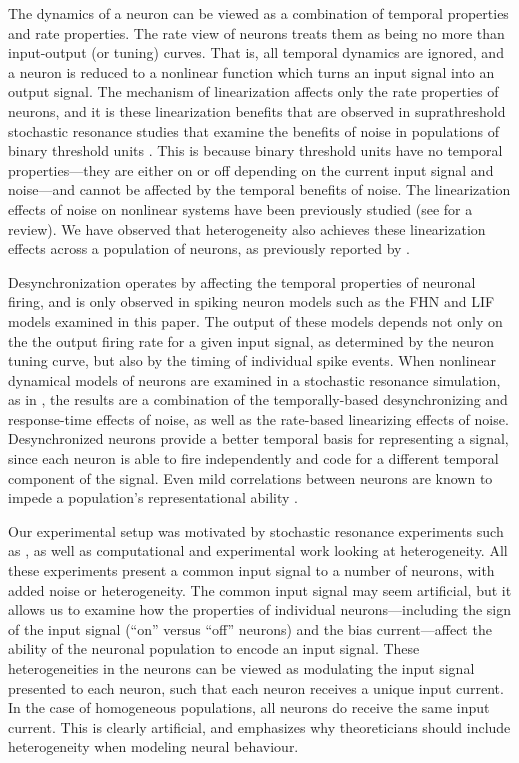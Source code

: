 \documentclass[letterpaper,11pt]{article}
\begin{document}
The dynamics of a neuron can be viewed as a combination of temporal properties and rate properties. The rate view of neurons treats them as being no more than input-output (or tuning) curves. That is, all temporal dynamics are ignored, and a neuron is reduced to a nonlinear function which turns an input signal into an output signal. The mechanism of linearization affects only the rate properties of neurons, and it is these linearization benefits that are observed in suprathreshold stochastic resonance studies that examine the benefits of noise in populations of binary threshold units \citep{Stocks2000,Stocks2001a,McDonnell2006}. This is because binary threshold units have no temporal properties---they are either on or off depending on the current input signal and noise---and cannot be affected by the temporal benefits of noise. The linearization effects of noise on nonlinear systems have been previously studied (see \cite{Stocks1996} for a review). We have observed that heterogeneity also achieves these linearization effects across a population of neurons, as previously reported by \cite{Eliasmith2003}.

Desynchronization operates by affecting the temporal properties of neuronal firing, and is only observed in spiking neuron models such as the FHN and LIF models examined in this paper. The output of these models depends not only on the the output firing rate for a given input signal, as determined by the neuron tuning curve, but also by the timing of individual spike events. When nonlinear dynamical models of neurons are examined in a stochastic resonance simulation, as in \cite{Stocks2001}, the results are a combination of the temporally-based desynchronizing and response-time effects of noise, as well as the rate-based linearizing effects of noise.  Desynchronized neurons provide a better temporal basis for representing a signal, since each neuron is able to fire independently and code for a different temporal component of the signal. Even mild correlations between neurons are known to impede a population's representational ability \citep{Zohary1994}.

Our experimental setup was motivated by stochastic resonance experiments such as \cite{Stocks2001}, as well as computational \citep{Brody2003} and experimental \citep{Padmanabhan2010} work looking at heterogeneity. All these experiments present a common input signal to a number of neurons, with added noise or heterogeneity. The common input signal may seem artificial, but it allows us to examine how the properties of individual neurons---including the sign of the input signal (``on'' versus ``off'' neurons) and the bias current---affect the ability of the neuronal population to encode an input signal. These heterogeneities in the neurons can be viewed as modulating the input signal presented to each neuron, such that each neuron receives a unique input current. In the case of homogeneous populations, all neurons do receive the same input current. This is clearly artificial, and emphasizes why theoreticians should include heterogeneity when modeling neural behaviour.
\end{document}
